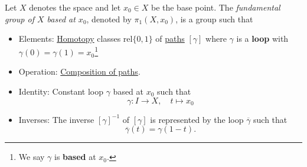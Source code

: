 \begin{definition}\label{def:fundamental-group}
	Let \(X\) denotes the space and let \(x_0\in X\) be the base point. The \emph{fundamental group of \(X\) based at \(x_0\)},
	denoted by \(\pi_1(X, x_0)\), is a group such that
	\begin{itemize}
		\item Elements: \hyperref[def:homotopy]{Homotopy} classes \(\mathrm{rel} \{0, 1\}\) of \hyperref[def:path]{paths} \([\gamma]\) where \(\gamma\) is a \textbf{loop}
		      with \(\gamma(0) = \gamma(1) = x_0\)\footnote{We say \(\gamma\) is \textbf{based} at \(x_0\).}
		      \begin{figure}[H]
			      \centering
			      \label{fig:def:fundamental-group-elements}
		      \end{figure}
		\item Operation: \hyperref[def:path-composition]{Composition of paths}.
		\item Identity: Constant loop \(\gamma\) based at \(x_0\) such that
		      \[
			      \gamma\colon I\to X,\quad t\mapsto x_0
		      \]
		\item Inverses: The inverse \([\gamma]^{-1}\) of \([\gamma]\) is represented by the loop \(\overline{\gamma}\) such that
		      \[
			      \overline{\gamma} (t) = \gamma(1-t).
		      \]
		      \begin{figure}[H]
			      \centering
			      \label{fig:def:fundamental-group-inverses}
		      \end{figure}
	\end{itemize}
\end{definition}
